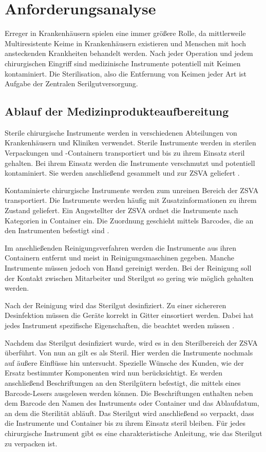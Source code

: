\chapter{Anforderungsanalyse}
Erreger in Krankenhäusern spielen eine immer größere Rolle, da mittlerweile Multiresistente Keime in Krankenhäusern existieren und Menschen mit hoch ansteckenden Krankheiten behandelt werden. Nach jeder Operation und jedem chirurgischen Eingriff sind medizinische Instrumente potentiell mit Keimen kontaminiert. Die Sterilisation, also die Entfernung von Keimen jeder Art ist Aufgabe der Zentralen Serilgutversorgung. 
%
%
\section{Ablauf der Medizinprodukteaufbereitung}
Sterile chirurgische Instrumente werden in verschiedenen Abteilungen von Krankenhäusern und Kliniken verwendet. Sterile Instrumente werden in sterilen Verpackungen und -Containern transportiert und bis zu ihrem Einsatz steril gehalten. Bei ihrem Einsatz werden die Instrumente verschmutzt und potentiell kontaminiert. Sie werden anschließend gesammelt und zur ZSVA geliefert \cite[S.~7]{Ruther2014}.

Kontaminierte chirurgische Instrumente werden zum unreinen Bereich der ZSVA transportiert. Die Instrumente werden häufig mit Zusatzinformationen zu ihrem Zustand geliefert. Ein Angestellter der ZSVA ordnet die Instrumente nach Kategorien in Container ein. Die Zuordnung geschieht mittels Barcodes, die an den Instrumenten befestigt sind \cite[S.~9]{Ruther2014}.

Im anschließenden Reinigungsverfahren werden die Instrumente aus ihren Containern entfernt und meist in Reinigungsmaschinen gegeben. Manche Instrumente müssen jedoch von Hand gereinigt werden. Bei der Reinigung soll der Kontakt zwischen Mitarbeiter und Sterilgut so gering wie möglich gehalten werden. 

Nach der Reinigung wird das Sterilgut desinfiziert. Zu einer sichereren Desinfektion müssen die Geräte korrekt in Gitter einsortiert werden. Dabei hat jedes Instrument spezifische Eigenschaften, die beachtet werden müssen \cite[S.~11]{Ruther2014}.

Nachdem das Sterilgut desinfiziert wurde, wird es in den Sterilbereich der ZSVA überführt. Von nun an gilt es als Steril. Hier werden die Instrumente nochmals auf äußere Einflüsse hin untersucht. Spezielle Wünsche des Kunden, wie der Ersatz bestimmter Komponenten wird nun berücksichtigt. Es werden anschließend Beschriftungen an den Sterilgütern befestigt, die mittels eines Barcode-Lesers ausgelesen werden können.
Die Beschriftungen enthalten neben dem Barcode den Namen des Instruments oder Container und das Ablaufdatum, an dem die Sterilität abläuft. Das Sterilgut wird anschließend so verpackt, dass die Instrumente und Container bis zu ihrem Einsatz steril bleiben. Für jedes chirurgische Instrument gibt es eine charakteristische Anleitung, wie das Sterilgut zu verpacken ist.

